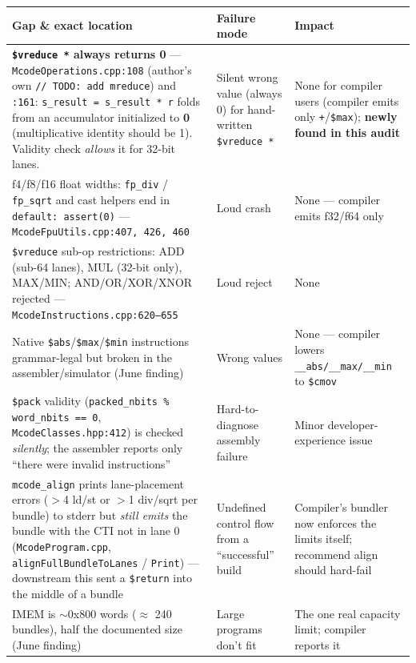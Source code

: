 \documentclass[11pt,a4paper]{report}
\begin{document}
\begin{longtable}{@{}p{5.2cm}p{4.2cm}p{4.6cm}@{}}
\toprule
Gap \& exact location & Failure mode & Impact \\
\midrule
\textbf{\texttt{\$vreduce *} always returns 0} ---
\texttt{McodeOperations.cpp:108} (author's own \texttt{// TODO: add
mreduce}) and \texttt{:161}: \texttt{s\_result = s\_result * r} folds from
an accumulator initialized to \textbf{0} (multiplicative identity should
be 1). Validity check \emph{allows} it for 32-bit lanes. &
Silent wrong value (always 0) for hand-written \texttt{\$vreduce *} &
None for compiler users (compiler emits only \texttt{+}/\texttt{\$max});
\textbf{newly found in this audit} \\
\addlinespace
f4/f8/f16 float widths: \texttt{fp\_div} / \texttt{fp\_sqrt} and cast
helpers end in \texttt{default: assert(0)} ---
\texttt{McodeFpuUtils.cpp:407, 426, 460} & Loud crash & None ---
compiler emits f32/f64 only \\
\addlinespace
\texttt{\$vreduce} sub-op restrictions: ADD (sub-64 lanes), MUL (32-bit
only), MAX/MIN; AND/OR/XOR/XNOR rejected ---
\texttt{McodeInstructions.cpp:620--655} & Loud reject & None \\
\addlinespace
Native \texttt{\$abs}/\texttt{\$max}/\texttt{\$min} instructions
grammar-legal but broken in the assembler/simulator (June finding) &
Wrong values & None --- compiler lowers \texttt{\_\_abs/\_\_max/\_\_min}
to \texttt{\$cmov} \\
\addlinespace
\texttt{\$pack} validity (\texttt{packed\_nbits \% word\_nbits == 0},
\texttt{McodeClasses.hpp:412}) is checked \emph{silently}; the assembler
reports only ``there were invalid instructions'' & Hard-to-diagnose
assembly failure & Minor developer-experience issue \\
\addlinespace
\texttt{mcode\_align} prints lane-placement errors ($>$4 ld/st or $>$1
div/sqrt per bundle) to stderr but \emph{still emits} the bundle with the
CTI not in lane 0 (\texttt{McodeProgram.cpp},
\texttt{alignFullBundleToLanes} / \texttt{Print}) --- downstream this sent
a \texttt{\$return} into the middle of a bundle & Undefined control flow
from a ``successful'' build & Compiler's bundler now enforces the limits
itself; recommend align should hard-fail \\
\addlinespace
IMEM is $\sim$0x800 words ($\approx$ 240 bundles), half the documented
size (June finding) & Large programs don't fit & The one real capacity
limit; compiler reports it \\
\bottomrule
\end{longtable}
\end{document}
